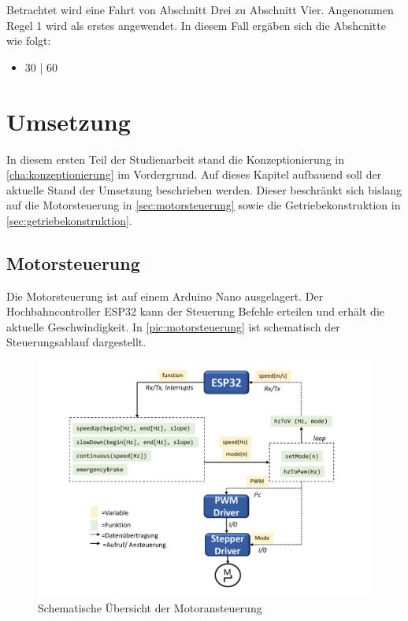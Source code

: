 \begin{example}
	Betrachtet wird eine Fahrt von Abschnitt Drei zu Abschnitt Vier. Angenommen Regel 1 wird als erstes angewendet. In diesem Fall ergäben sich die Abshcnitte wie folgt:
	\begin{itemize}
		\item 30 | 60
	\end{itemize}
\end{example}
\chapter{Umsetzung} 
\label{cha:umsetzung}
In diesem ersten Teil der Studienarbeit stand die Konzeptionierung in \autoref{cha:konzeptionierung} im Vordergrund. Auf dieses Kapitel aufbauend soll der aktuelle Stand der Umsetzung beschrieben werden. Dieser beschränkt sich bislang auf die Motorsteuerung in \autoref{sec:motorsteuerung} sowie die Getriebekonstruktion in \autoref{sec:getriebekonstruktion}.
\newpage
 
\section{Motorsteuerung}
\label{sec:motorsteuerung}
Die Motorsteuerung ist auf einem Arduino Nano ausgelagert. Der Hochbahncontroller ESP32 kann der Steuerung Befehle erteilen und erhält die aktuelle Geschwindigkeit. In \autoref{pic:motorsteuerung} ist schematisch der Steuerungsablauf  dargestellt. 

\begin{figure}[h]
	\begin{center}
		\includegraphics[width=16cm]{motorsteuerung.pdf}
		\caption{Schematische Übersicht der Motoransteuerung}
		\label{pic:motorsteuerung}
	\end{center}
\end{figure}



